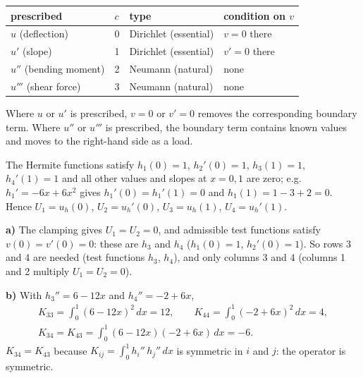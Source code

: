 \begin{center}
\begin{tabular}{llll}
  \toprule
  prescribed & $c$ & type & condition on $v$ \\
  \midrule
  $u$ (deflection) & 0 & \textcolor{dir}{Dirichlet (essential)} & $v = 0$ there \\
  $u'$ (slope) & 1 & \textcolor{dir}{Dirichlet (essential)} & $v' = 0$ there \\
  $u''$ (bending moment) & 2 & \textcolor{neu}{Neumann (natural)} & none \\
  $u'''$ (shear force) & 3 & \textcolor{neu}{Neumann (natural)} & none \\
  \bottomrule
\end{tabular}
\end{center}

Where $u$ or $u'$ is prescribed, $v = 0$ or $v' = 0$ removes the corresponding boundary term. Where $u''$ or $u'''$ is
prescribed, the boundary term contains known values and moves to the right-hand side as a load.

 The Hermite functions satisfy $h_1(0) = 1$, $h_2'(0) = 1$, $h_3(1) = 1$, $h_4'(1) = 1$ and all other values
and slopes at $x = 0, 1$ are zero; e.g.\ $h_1' = -6x + 6x^2$ gives $h_1'(0) = h_1'(1) = 0$ and $h_1(1) = 1 - 3 + 2 = 0$.
Hence $U_1 = u_h(0)$, $U_2 = u_h'(0)$, $U_3 = u_h(1)$, $U_4 = u_h'(1)$.

\textbf{a)} The clamping gives $U_1 = U_2 = 0$, and admissible test functions satisfy $v(0) = v'(0) = 0$: these are
$h_3$ and $h_4$ ($h_1(0) = 1$, $h_2'(0) = 1$). So rows 3 and 4 are needed (test functions $h_3$, $h_4$), and only
columns 3 and 4 (columns 1 and 2 multiply $U_1 = U_2 = 0$).

\textbf{b)} With $h_3'' = 6 - 12x$ and $h_4'' = -2 + 6x$,
\begin{gather*}
  K_{33} = \int_0^1 (6 - 12x)^2 \, dx = 12, \qquad
  K_{44} = \int_0^1 (-2 + 6x)^2 \, dx = 4, \\
  K_{34} = K_{43} = \int_0^1 (6 - 12x)(-2 + 6x) \, dx = -6 .
\end{gather*}
$K_{34} = K_{43}$ because $K_{ij} = \int_0^1 h_i''\, h_j'' \, dx$ is symmetric in $i$ and $j$: the operator is symmetric.

